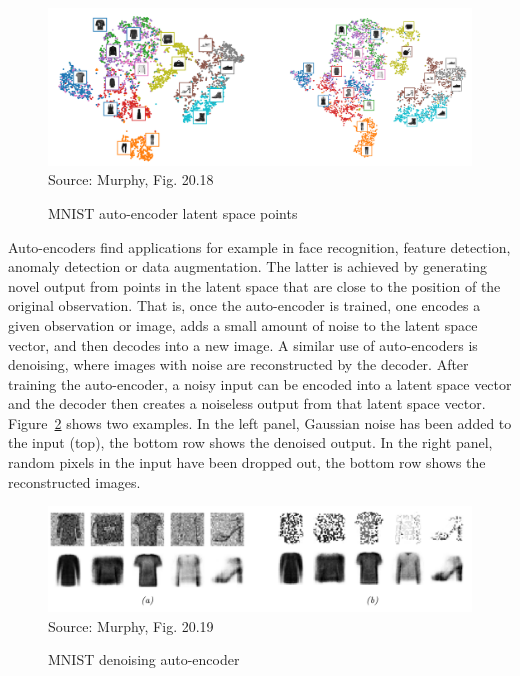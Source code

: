 \begin{figure}
\begin{center}
\includegraphics[width=\textwidth]{murphy_20_18.png} \\

\scriptsize Source: Murphy, Fig. 20.18 \normalsize
\end{center}
\caption{MNIST auto-encoder latent space points}
\label{fig:mnist_autoencoder_latent_space}
\end{figure}

Auto-encoders find applications for example in face recognition, feature detection, anomaly detection or data augmentation. The latter is achieved by generating novel output from points in the latent space that are close to the position of the original observation. That is, once the auto-encoder is trained, one encodes a given observation or image, adds a small amount of noise to the latent space vector, and then decodes into a new image. A similar use of auto-encoders is denoising, where images with noise are reconstructed by the decoder. After training the auto-encoder, a noisy input can be encoded into a latent space vector and the decoder then creates a noiseless output from that latent space vector. Figure~\ref{fig:murphy_20_19} shows two examples. In the left panel, Gaussian noise has been added to the input (top), the bottom row shows the denoised output. In the right panel, random pixels in the input have been dropped out, the bottom row shows the reconstructed images.

\begin{figure}
\begin{center}
\includegraphics[width=\textwidth]{murphy_20_19.png} \\

\scriptsize Source: Murphy, Fig. 20.19 \normalsize
\end{center}
\caption{MNIST denoising auto-encoder}
\label{fig:murphy_20_19}
\end{figure}


